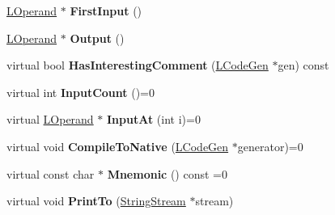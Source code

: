 \begin{DoxyCompactItemize}
\item 
\hyperlink{classv8_1_1internal_1_1_l_operand}{L\+Operand} $\ast$ {\bfseries First\+Input} ()\hypertarget{classv8_1_1internal_1_1_l_instruction_ad9675d1c06250b28199f105835b80329}{}\label{classv8_1_1internal_1_1_l_instruction_ad9675d1c06250b28199f105835b80329}

\item 
\hyperlink{classv8_1_1internal_1_1_l_operand}{L\+Operand} $\ast$ {\bfseries Output} ()\hypertarget{classv8_1_1internal_1_1_l_instruction_ac4116b2faee2d8d3f0d7d21a27b40ad4}{}\label{classv8_1_1internal_1_1_l_instruction_ac4116b2faee2d8d3f0d7d21a27b40ad4}

\item 
virtual bool {\bfseries Has\+Interesting\+Comment} (\hyperlink{classv8_1_1internal_1_1_l_code_gen}{L\+Code\+Gen} $\ast$gen) const \hypertarget{classv8_1_1internal_1_1_l_instruction_affae35afdf10150a226c035d47b8ce27}{}\label{classv8_1_1internal_1_1_l_instruction_affae35afdf10150a226c035d47b8ce27}

\item 
virtual int {\bfseries Input\+Count} ()=0\hypertarget{classv8_1_1internal_1_1_l_instruction_a10b5af4413b64db11db6f4dc266b5e4f}{}\label{classv8_1_1internal_1_1_l_instruction_a10b5af4413b64db11db6f4dc266b5e4f}

\item 
virtual \hyperlink{classv8_1_1internal_1_1_l_operand}{L\+Operand} $\ast$ {\bfseries Input\+At} (int i)=0\hypertarget{classv8_1_1internal_1_1_l_instruction_a65f5b87101a6f411d73e5ba9aa13a675}{}\label{classv8_1_1internal_1_1_l_instruction_a65f5b87101a6f411d73e5ba9aa13a675}

\item 
virtual void {\bfseries Compile\+To\+Native} (\hyperlink{classv8_1_1internal_1_1_l_code_gen}{L\+Code\+Gen} $\ast$generator)=0\hypertarget{classv8_1_1internal_1_1_l_instruction_acab3d83fd0de1d783ce5e5e8651009dd}{}\label{classv8_1_1internal_1_1_l_instruction_acab3d83fd0de1d783ce5e5e8651009dd}

\item 
virtual const char $\ast$ {\bfseries Mnemonic} () const  =0\hypertarget{classv8_1_1internal_1_1_l_instruction_ae256d0dcc2d6017d8c49d382254dccee}{}\label{classv8_1_1internal_1_1_l_instruction_ae256d0dcc2d6017d8c49d382254dccee}

\item 
virtual void {\bfseries Print\+To} (\hyperlink{classv8_1_1internal_1_1_string_stream}{String\+Stream} $\ast$stream)\hypertarget{classv8_1_1internal_1_1_l_instruction_a7fd3ca39e41f221d7dd97c947219770c}{}\label{classv8_1_1internal_1_1_l_instruction_a7fd3ca39e41f221d7dd97c947219770c}


\end{DoxyCompactItemize}
